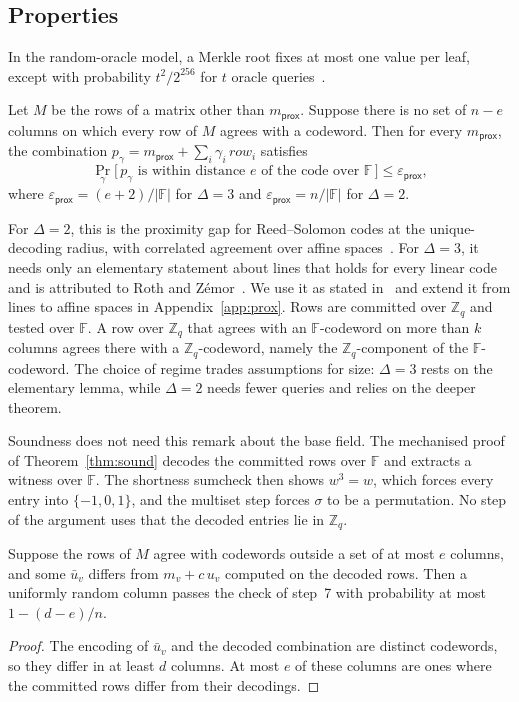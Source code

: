 \documentclass[sigconf,anonymous]{acmart}
\newcommand{\Zq}{\mathbb{Z}_q}
\newcommand{\F}{\mathbb{F}}
\newcommand{\epsprox}{\varepsilon_{\mathsf{prox}}}
\begin{document}
\subsection{Properties}

\begin{lemma}[Binding]\label{lem:bind}
In the random-oracle model, a Merkle root fixes at most one value per leaf, except with probability
$t^2/2^{256}$ for $t$ oracle queries~\cite{BCS16}.
\end{lemma}

\begin{lemma}[Proximity]\label{lem:prox}
Let $M$ be the rows of a matrix other than $m_{\mathsf{prox}}$. Suppose there is no set of $n-e$
columns on which every row of $M$ agrees with a codeword. Then for every $m_{\mathsf{prox}}$, the
combination $p_\gamma=m_{\mathsf{prox}}+\sum_i\gamma_i\,\mathit{row}_i$ satisfies
\[
  \Pr_{\gamma}\bigl[\,p_\gamma \text{ is within distance } e \text{ of the code over } \F\,\bigr]\le\epsprox ,
\]
where $\epsprox=(e+2)/|\F|$ for $\Delta=3$ and $\epsprox=n/|\F|$ for $\Delta=2$.
\end{lemma}

For $\Delta=2$, this is the proximity gap for Reed--Solomon codes at the unique-decoding radius,
with correlated agreement over affine spaces~\cite[Thm.~1.6]{BCIKS20}. For $\Delta=3$, it needs
only an elementary statement about lines that holds for every linear code and is attributed to Roth
and Z\'emor~\cite{AHIV17}. We use it as stated in~\cite[Thm.~2.1]{DP23} and extend it from lines to
affine spaces in Appendix~\ref{app:prox}. Rows are committed over $\Zq$ and tested over $\F$. A row
over $\Zq$ that agrees with an $\F$-codeword on more than $k$ columns agrees there with a
$\Zq$-codeword, namely the $\Zq$-component of the $\F$-codeword. The choice of regime trades
assumptions for size: $\Delta=3$ rests on the elementary lemma, while $\Delta=2$ needs fewer queries
and relies on the deeper theorem.

Soundness does not need this remark about the base field. The mechanised proof of
Theorem~\ref{thm:sound} decodes the committed rows over $\F$ and extracts a witness over $\F$. The
shortness sumcheck then shows $w^3=w$, which forces every entry into $\{-1,0,1\}$, and the
multiset step forces $\sigma$ to be a permutation. No step of the argument uses that the decoded
entries lie in $\Zq$.

\begin{lemma}[Consistency]\label{lem:cons}
Suppose the rows of $M$ agree with codewords outside a set of at most $e$ columns, and some
$\bar u_v$ differs from $m_v+c\,u_v$ computed on the decoded rows. Then a uniformly random column
passes the check of step~7 with probability at most $1-(d-e)/n$.
\end{lemma}
\begin{proof}
The encoding of $\bar u_v$ and the decoded combination are distinct codewords, so they differ in at
least $d$ columns. At most $e$ of these columns are ones where the committed rows differ from their
decodings.
\end{proof}
\end{document}
